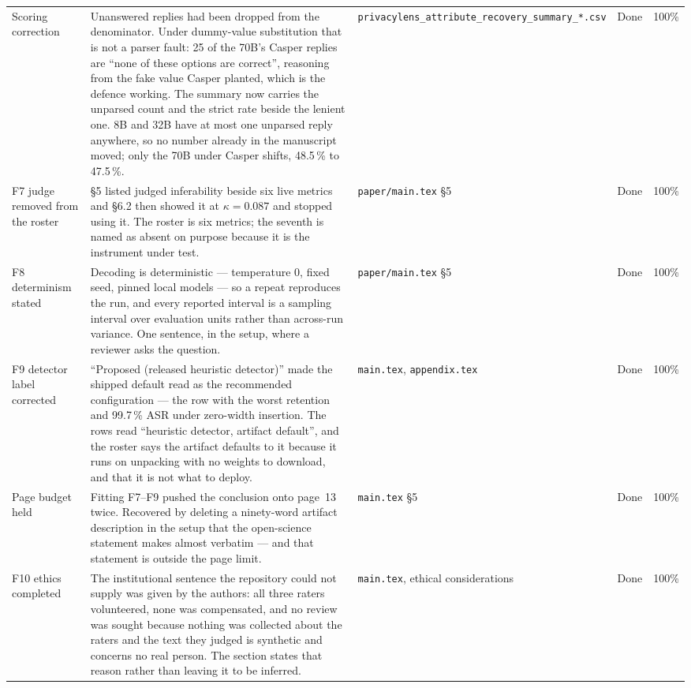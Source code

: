 \documentclass[11pt]{article}
\begin{document}
\begin{longtable}{p{}p{}p{}p{}p{}}
Scoring correction & Unanswered replies had been dropped from the denominator. Under dummy-value substitution that is not a parser fault: 25 of the 70B's Casper replies are ``none of these options are correct'', reasoning from the fake value Casper planted, which is the defence working. The summary now carries the unparsed count and the strict rate beside the lenient one. 8B and 32B have at most one unparsed reply anywhere, so no number already in the manuscript moved; only the 70B under Casper shifts, 48.5\,\% to 47.5\,\%. & \texttt{privacylens\_attribute\_recovery\_summary\_*.csv} & Done & 100\% \\
F7 judge removed from the roster & \S5 listed judged inferability beside six live metrics and \S6.2 then showed it at $\kappa=0.087$ and stopped using it. The roster is six metrics; the seventh is named as absent on purpose because it is the instrument under test. & \texttt{paper/main.tex} \S5 & Done & 100\% \\
F8 determinism stated & Decoding is deterministic --- temperature $0$, fixed seed, pinned local models --- so a repeat reproduces the run, and every reported interval is a sampling interval over evaluation units rather than across-run variance. One sentence, in the setup, where a reviewer asks the question. & \texttt{paper/main.tex} \S5 & Done & 100\% \\
F9 detector label corrected & ``Proposed (released heuristic detector)'' made the shipped default read as the recommended configuration --- the row with the worst retention and 99.7\,\% ASR under zero-width insertion. The rows read ``heuristic detector, artifact default'', and the roster says the artifact defaults to it because it runs on unpacking with no weights to download, and that it is not what to deploy. & \texttt{main.tex}, \texttt{appendix.tex} & Done & 100\% \\
Page budget held & Fitting F7--F9 pushed the conclusion onto page~13 twice. Recovered by deleting a ninety-word artifact description in the setup that the open-science statement makes almost verbatim --- and that statement is outside the page limit. & \texttt{main.tex} \S5 & Done & 100\% \\
F10 ethics completed & The institutional sentence the repository could not supply was given by the authors: all three raters volunteered, none was compensated, and no review was sought because nothing was collected about the raters and the text they judged is synthetic and concerns no real person. The section states that reason rather than leaving it to be inferred. & \texttt{main.tex}, ethical considerations & Done & 100\% \\

\end{longtable}
\end{document}

